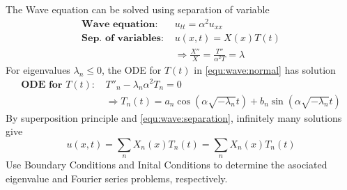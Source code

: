 \documentclass[10pt,leqno]{article}
\begin{document}
\begin{center}
\begin{minipage}{6in}
The Wave equation can be solved using separation of variable
\begin{align}
    \textbf{Wave equation:\ }& u_{tt}=\alpha^{2} u_{xx} \\
    \textbf{Sep. of variables:\ }& u(x,t)=X(x)T(t) \label{equ:wave:separation} \\
    & \Rightarrow \frac{X''}{X} = \frac{T''}{\alpha^{2} T} = \lambda \label{equ:wave:normal}
\end{align}
For eigenvalues $\lambda_{n}\leq0$, the ODE for $T(t)$ in \eqref{equ:wave:normal} has solution
\begin{align}
\textbf{ODE for $T(t)$:\ } & T''_{n} -\lambda_{n} \alpha^{2} T_{n} = 0 \\
& \Rightarrow T_{n}(t)=a_{n}\cos(\alpha\sqrt{-\lambda_{n}}t)+b_{n}\sin(\alpha\sqrt{-\lambda_{n}}t)
\end{align}
By superposition principle and \eqref{equ:wave:separation}, infinitely many solutions give
\begin{equation}
u(x,t)=\sum_{n} X_{n}(x)T_{n}(t) = \sum_{n} X_{n}(x)T_{n}(t)
\end{equation}
Use Boundary Conditions and Inital Conditions to determine the asociated eigenvalue and Fourier series problems, respectively.
\end{minipage}
\end{center}
\end{document}
